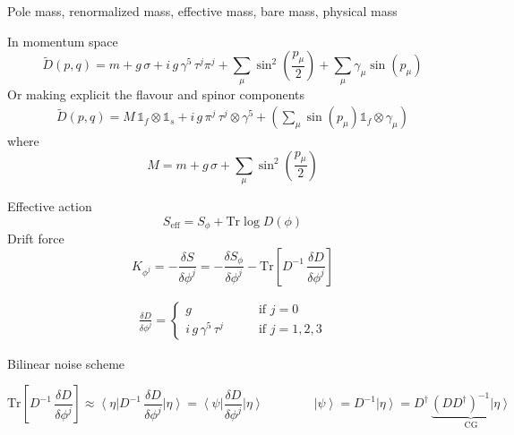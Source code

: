 Pole mass, renormalized mass, effective mass, bare mass, physical mass


In momentum space
\begin{equation*}
    \tilde D(p,q) = m + g \, \sigma + i \, g \, \gamma^5 \, \tau^j \pi^j + \sum_{\mu} \sin^2\left(\frac{p_\mu}{2}\right) + \sum_\mu \gamma_\mu \sin\left(p_\mu\right)
\end{equation*}
Or making explicit the flavour and spinor components
\begin{gather*}
     \tilde D(p,q) = M \, \mathds{1}_f \otimes \mathds{1}_s  + i \, g \, \pi^j \, \tau^j \otimes \gamma^5   + \left(\sum_\mu \sin\left(p_\mu\right) \mathds{1}_f \otimes \gamma_\mu\right)
\end{gather*}
where 
\begin{equation*}
   M = m + g \, \sigma + \sum_{\mu} \sin^2\left(\frac{p_\mu}{2}\right)
\end{equation*}









Effective action
\begin{equation*}
    S_{\text{eff}} = S_\phi + \text{Tr} \log D(\phi)
\end{equation*}
Drift force
\begin{equation*}
    K_{\phi^j} = - \frac{\delta S}{\delta \phi^j} = - \frac{\delta S_\phi}{\delta \phi^j} - \text{Tr} \left[ D^{-1} \, \frac{\delta D}{\delta \phi^j} \right]
\end{equation*}

\begin{align*}
    \frac{\delta D}{\delta \phi^j} = 
    \begin{cases}
        g \qquad &\text{if } j = 0 \\
        i \, g \, \gamma^5 \, \tau^j \qquad &\text{if } j = 1,2,3
    \end{cases}
\end{align*}

Bilinear noise scheme

\begin{equation*}
    \text{Tr} \left[ D^{-1} \, \frac{\delta D}{\delta \phi^j} \right] \approx \left\langle \eta \right|  D^{-1} \, \frac{\delta D}{\delta \phi^j} \left| \eta \right\rangle = 
    \left\langle \psi \right| \frac{\delta D}{\delta \phi^j} \left| \eta \right\rangle
    \qquad\qquad \left| \psi \right\rangle = D^{-1} \left| \eta \right\rangle = D^\dagger \, \underbrace{(D D^\dagger)^{-1} \left| \eta \right\rangle}_{\text{CG}}
\end{equation*}

